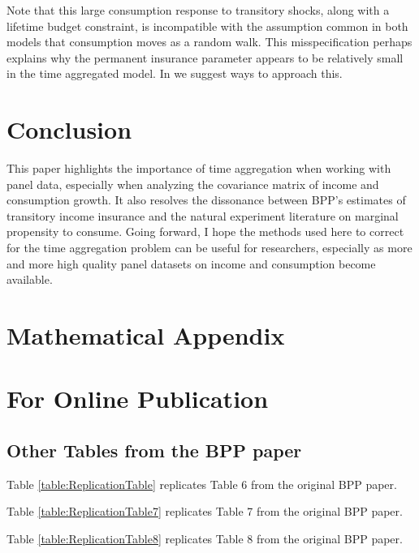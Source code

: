 \documentclass[AER]{AEA}
\begin{document}
Note that this large consumption response to transitory shocks, along with a lifetime budget constraint, is incompatible with the assumption common in both models that consumption moves as a random walk. This misspecification perhaps explains why the permanent insurance parameter appears to be relatively small in the time aggregated model. In \cite{crawley_consumption_2018} we suggest ways to approach this.

\section{Conclusion}
This paper highlights the importance of time aggregation when working with panel data, especially when analyzing the covariance matrix of income and consumption growth. It also resolves the dissonance between BPP's estimates of transitory income insurance and the natural experiment literature on marginal propensity to consume. Going forward, I hope the methods used here to correct for the time aggregation problem can be useful for researchers, especially as more and more high quality panel datasets on income and consumption become available.





\appendix

\section{Mathematical Appendix}

\section{For Online Publication}




\subsection{Other Tables from the BPP paper} \label{table_appendix}

Table \ref{table:ReplicationTable} replicates Table 6 from the original BPP paper.

 

Table \ref{table:ReplicationTable7} replicates Table 7 from the original BPP paper.

 

Table \ref{table:ReplicationTable8} replicates Table 8 from the original BPP paper.
\end{document}
